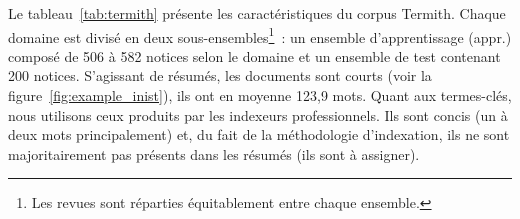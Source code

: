     Le tableau~\ref{tab:termith} présente les caractéristiques du corpus
    Termith. Chaque domaine est divisé en deux sous-ensembles\footnote{Les
    revues sont réparties équitablement entre chaque ensemble.}~: un ensemble
    d'apprentissage (appr.) composé de 506 à 582 notices selon le domaine et un
    ensemble de test contenant 200 notices. S'agissant de résumés, les documents
    sont courts (voir la figure~\ref{fig:example_inist}), ils ont en moyenne 123,9
    mots. Quant aux termes-clés, nous utilisons ceux produits par les indexeurs
    professionnels. Ils sont concis (un à deux mots principalement) et, du fait
    de la méthodologie d'indexation, ils ne sont majoritairement pas présents
    dans les résumés (ils sont \og{}à assigner\fg{}).
